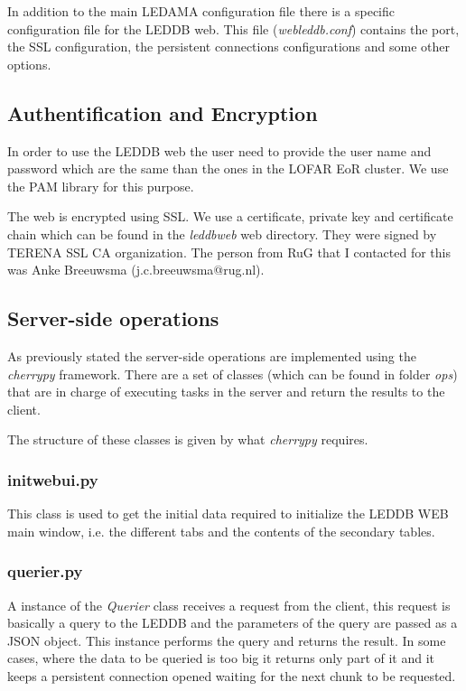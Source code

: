 \documentclass[a4paper,11pt]{article}
\begin{document}
In addition to the main LEDAMA configuration file there is a specific configuration file for the LEDDB web. This file (\textit{webleddb.conf}) contains the port, the SSL configuration, the persistent connections configurations and some other options.

\subsection{Authentification and Encryption}

In order to use the LEDDB web the user need to provide the user name and password which are the same than the ones in the LOFAR EoR cluster. We use the PAM library for this purpose.

The web is encrypted using SSL. We use a certificate, private key and certificate chain which can be found in the \textit{leddbweb} web directory. They were signed by TERENA SSL CA organization. The person from RuG that I contacted for this was Anke Breeuwsma (j.c.breeuwsma@rug.nl). 

\subsection{Server-side operations}

As previously stated the server-side operations are implemented using the \textit{cherrypy} framework. There are a set of classes (which can be found in folder \textit{ops}) that are in charge of executing tasks in the server and return the results to the client.

The structure of these classes is given by what \textit{cherrypy} requires. 

\subsubsection*{initwebui.py}

This class is used to get the initial data required to initialize the LEDDB WEB main window, i.e. the different tabs and the contents of the secondary tables.

\subsubsection*{querier.py}

A instance of the \textit{Querier} class receives a request from the client, this request is basically a query to the LEDDB and the parameters of the query are passed as a JSON object. This instance performs the query and returns the result. In some cases, where the data to be queried is too big it returns only part of it and it keeps a persistent connection opened waiting for the next chunk to be requested.
\end{document}
